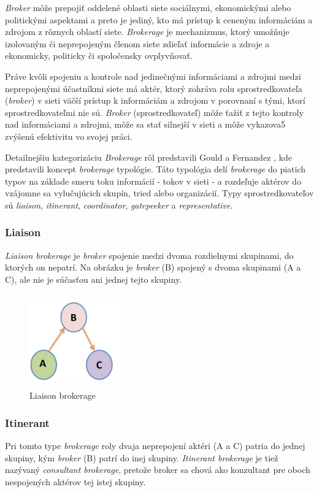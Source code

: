 \documentclass[slovak,master,public,dept460,male,cpdeclaration,oneside]{diploma}
\begin{document}
\textit{Broker} môže prepojiť oddelené oblasti siete sociálnymi, ekonomickými alebo politickými aspektami a preto je jediný, kto má prístup k ceneným informáciám a zdrojom z rôznych oblastí siete. \textit{Brokerage} je mechanizmus, ktorý umožňuje izolovaným či neprepojeným členom siete zdieľať informácie a zdroje a ekonomicky, politicky či spoločensky ovplyvňovať. \cite{16}

Práve kvôli spojeniu a kontrole nad jedinečnými informáciami a zdrojmi medzi neprepojenými účastníkmi siete má aktér, ktorý zohráva rolu sprostredkovateľa (\textit{broker}) v sieti väčší prístup k informáciám a zdrojom v porovnaní s tými, ktorí sprostredkovateľmi nie sú. \textit{Broker} (sprostredkovateľ) môže ťažiť z tejto kontroly nad informáciami a zdrojmi, môže sa stať silnejší v sieti a môže vykazova5 zvýšenú efektivitu vo svojej práci. \cite{16}


Detailnejšiu kategorizáciu \textit{Brokerage} rôl predstavili Gould a Fernandez \cite{15}, kde predstavili koncept \textit{brokerage} typológie. Táto typológia delí \textit{brokerage} do piatich typov na základe smeru toku informácií - tokov v sieti - a rozdeľuje aktérov do vzájomne sa vylučujúcich skupín, tried alebo organizácií.
Typy sprostredkovateľov sú \textit{liaison}, \textit{itinerant}, \textit{coordinator}, \textit{gatepeeker} a \textit{representative}.

\subsubsection{Liaison}

\textit{Liaison brokerage} je \textit{broker} spojenie medzi dvoma rozdielnymi skupinami, do ktorých on nepatrí. Na obrázku je \textit{broker} (B) spojený s dvoma skupinami (A a C), ale nie je súčasťou ani jednej tejto skupiny. 

\begin{figure}[H]
\centering
\includegraphics[width=4cm, height=4cm]{figures/liaison}
\caption{Liaison brokerage}
\end{figure}

\subsubsection{Itinerant}
Pri tomto type \textit{brokerage} roly dvaja neprepojení aktéri (A a C) patria do jednej skupiny, kým \textit{broker} (B) patrí do inej skupiny. \textit{Itinerant brokerage} je tiež nazývaný \textit{consultant brokerage}, pretože broker sa chová ako konzultant pre oboch nespojených aktérov tej istej skupiny.
\end{document}
